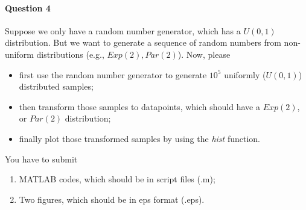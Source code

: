\documentclass[11pt]{article} %
\begin{document}
\paragraph*{Question 4}

Suppose we only have a random number generator, which has a $U(0, 1)$ distribution. But we want to generate a sequence of random numbers from non-uniform distributions (e.g., $Exp(2), Par(2)$). Now, please 
\begin{itemize}
\item first use the random number generator to generate $10^5$ uniformly ($U(0, 1)$) distributed samples; 
\item then transform those samples to datapoints, which should have a $Exp(2)$, or $Par(2)$ distribution;
\item finally plot those transformed samples by using the {\it hist} function. 
\end{itemize}
You have to submit 
\begin{enumerate}
\item MATLAB codes, which should be in script files (.m);
\item Two figures, which should be in eps format (.eps).
\end{enumerate}
\end{document}
